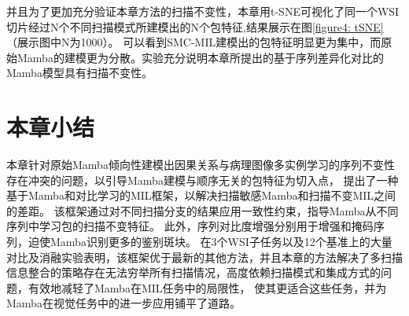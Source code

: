 并且为了更加充分验证本章方法的扫描不变性，本章用t-SNE可视化了同一个WSI切片经过N个不同扫描模式所建模出的N个包特征,结果展示在图\ref{figure4: tSNE}（展示图中N为1000）。
可以看到SMC-MIL建模出的包特征明显更为集中，而原始Mamba的建模更为分散。实验充分说明本章所提出的基于序列差异化对比的Mamba模型具有扫描不变性。

\section[\hspace{-2pt}本章小结]{{\heiti{} \hspace{-8pt}本章小结}}\label{section4: 本章小结}

本章针对原始Mamba倾向性建模出因果关系与病理图像多实例学习的序列不变性存在冲突的问题，以引导Mamba建模与顺序无关的包特征为切入点，
提出了一种基于Mamba和对比学习的MIL框架，以解决扫描敏感Mamba和扫描不变MIL之间的差距。
该框架通过对不同扫描分支的结果应用一致性约束，指导Mamba从不同序列中学习包的扫描不变特征。
此外，序列对比度增强分别用于增强和掩码序列，迫使Mamba识别更多的鉴别斑块。
在3个WSI子任务以及12个基准上的大量对比及消融实验表明，该框架优于最新的其他方法，并且本章的方法解决了多扫描信息整合的策略存在无法穷举所有扫描情况，高度依赖扫描模式和集成方式的问题，有效地减轻了Mamba在MIL任务中的局限性，
使其更适合这些任务，并为Mamba在视觉任务中的进一步应用铺平了道路。
